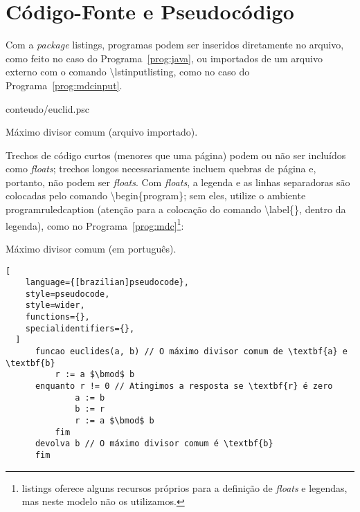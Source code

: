 
\chapter{Código-Fonte e Pseudocódigo}
\label{ap:pseudocode}

Com a \textit{package} \textsf{listings}, programas podem ser inseridos
diretamente no arquivo, como feito no caso do Programa~\ref{prog:java},
ou importados de um arquivo externo com o comando
\textsf{\textbackslash{}lstinputlisting}, como no caso
do Programa~\ref{prog:mdcinput}.

\begin{program}
  
  {conteudo/euclid.psc}

  \caption{Máximo divisor comum (arquivo importado).\label{prog:mdcinput}}
\end{program}

Trechos de código curtos (menores que uma página) podem ou não ser
incluídos como \textit{floats}; trechos longos necessariamente incluem
quebras de página e, portanto, não podem ser \textit{floats}. Com
\textit{floats}, a legenda e as linhas separadoras são colocadas pelo
comando \textsf{\textbackslash{}begin\{program\}}; sem eles, utilize o
ambiente \textsf{programruledcaption} (atenção para a colocação do
comando \textsf{\textbackslash{}label\{\}}, dentro da legenda), como
no Programa~\ref{prog:mdc}\footnote{\textsf{listings} oferece alguns
recursos próprios para a definição de \textit{floats} e legendas, mas
neste modelo não os utilizamos.}:

\begin{programruledcaption}{Máximo divisor comum (em português).\label{prog:mdc}}
  \begin{lstlisting}[
    language={[brazilian]pseudocode},
    style=pseudocode,
    style=wider,
    functions={},
    specialidentifiers={},
  ]
      funcao euclides(a, b) // O máximo divisor comum de \textbf{a} e \textbf{b}
          r := a $\bmod$ b
	  enquanto r != 0 // Atingimos a resposta se \textbf{r} é zero
              a := b
              b := r
              r := a $\bmod$ b
          fim
	  devolva b // O máximo divisor comum é \textbf{b}
      fim
  \end{lstlisting}
\end{programruledcaption}

